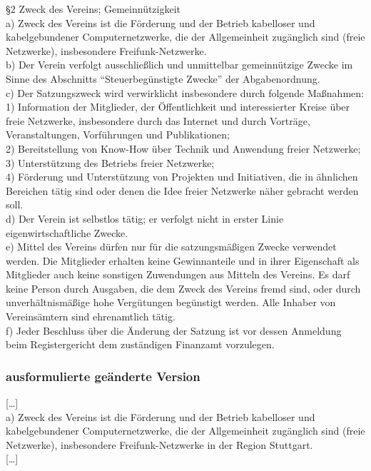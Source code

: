 \documentclass[a4paper]{scrartcl}
\begin{document}
§2 Zweck des Vereins; Gemeinnützigkeit\\
a) Zweck des Vereins ist die Förderung und der Betrieb kabelloser und kabelgebundener Computernetzwerke, die der Allgemeinheit zugänglich sind (freie Netzwerke), insbesondere Freifunk-Netzwerke.\\
b) Der Verein verfolgt ausschließlich und unmittelbar gemeinnützige Zwecke im Sinne des Abschnitts “Steuerbegünstigte Zwecke” der Abgabenordnung.\\
c) Der Satzungszweck wird verwirklicht insbesondere durch folgende Maßnahmen:\\
1) Information der Mitglieder, der Öffentlichkeit und interessierter Kreise über freie Netzwerke, insbesondere durch das Internet und durch Vorträge, Veranstaltungen, Vorführungen und Publikationen;\\
2) Bereitstellung von Know-How über Technik und Anwendung freier Netzwerke;\\
3) Unterstützung des Betriebs freier Netzwerke;\\
4) Förderung und Unterstützung von Projekten und Initiativen, die in ähnlichen Bereichen tätig sind oder denen die Idee freier Netzwerke näher gebracht werden soll.\\
d) Der Verein ist selbstlos tätig; er verfolgt nicht in erster Linie eigenwirtschaftliche Zwecke.\\
e) Mittel des Vereins dürfen nur für die satzungsmäßigen Zwecke verwendet werden. Die Mitglieder erhalten keine Gewinnanteile und in ihrer Eigenschaft als Mitglieder auch keine sonstigen Zuwendungen aus Mitteln des Vereins. Es darf keine Person durch Ausgaben, die dem Zweck des Vereins fremd sind, oder durch unverhältnismäßige hohe Vergütungen begünstigt werden. Alle Inhaber von Vereinsämtern sind ehrenamtlich tätig.\\
f) Jeder Beschluss über die Änderung der Satzung ist vor dessen Anmeldung beim Registergericht dem zuständigen Finanzamt vorzulegen.\\

\subsubsection{ausformulierte geänderte Version}

{[}\dots{]}\\
a) Zweck  des Vereins ist die Förderung und der Betrieb kabelloser und  kabelgebundener Computernetzwerke, die der Allgemeinheit zugänglich  sind (freie Netzwerke), insbesondere Freifunk-Netzwerke in der Region Stuttgart.\\
{[}\dots{]}\\
\end{document}
